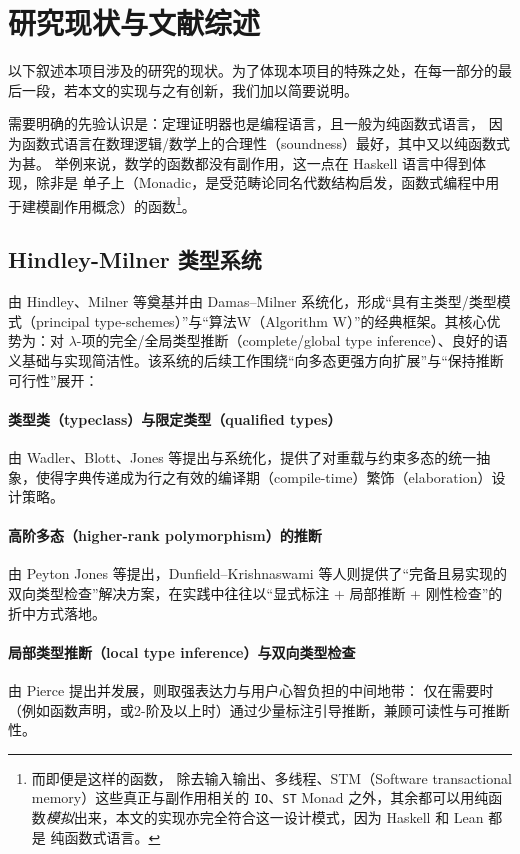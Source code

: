 \section{研究现状与文献综述}
以下叙述本项目涉及的研究的现状。为了体现本项目的特殊之处，在每一部分的最后一段，若本文的实现与之有创新，我们加以简要说明。

需要明确的先验认识是：定理证明器也是编程语言，且一般为纯函数式语言，
因为函数式语言在数理逻辑/数学上的合理性（soundness）最好，其中又以纯函数式为甚。
举例来说，数学的函数都没有副作用，这一点在 Haskell 语言中得到体现，除非是
单子上（Monadic，是受范畴论同名代数结构启发，函数式编程中用于建模副作用概念）的函数\footnote{
  而即便是这样的函数，
  除去输入输出、多线程、STM（Software transactional memory）这些真正与副作用相关的 \texttt{IO}、\texttt{ST} Monad 之外，其余都可以用纯函数\emph{模拟}出来，本文的实现亦完全符合这一设计模式，因为 Haskell 和 Lean 都是
  纯函数式语言。
}。
\subsection{Hindley-Milner 类型系统} 由 Hindley、Milner 等奠基并由 Damas–Milner 系统化，形成“具有主类型/类型模式（principal type-schemes）”与“算法W（Algorithm W）”的经典框架。其核心优势为：对 $\lambda$-项的完全/全局类型推断（complete/global type inference）、良好的语义基础与实现简洁性。该系统的后续工作围绕“向多态更强方向扩展”与“保持推断可行性”展开：
\paragraph{类型类（typeclass）与限定类型（qualified types）} 由 Wadler、Blott、Jones 等提出与系统化，提供了对重载与约束多态的统一抽象，使得字典传递成为行之有效的编译期（compile-time）繁饰（elaboration）设计策略。
\paragraph{高阶多态（higher-rank polymorphism）的推断} 由 Peyton Jones 等提出，Dunfield–Krishnaswami 等人则提供了“完备且易实现的双向类型检查”解决方案，在实践中往往以“显式标注 + 局部推断 + 刚性检查”的折中方式落地。
\paragraph{局部类型推断（local type inference）与双向类型检查} 由 Pierce 提出并发展，则取强表达力与用户心智负担的中间地带：
仅在需要时（例如函数声明，或2-阶及以上时）通过少量标注引导推断，兼顾可读性与可推断性。

